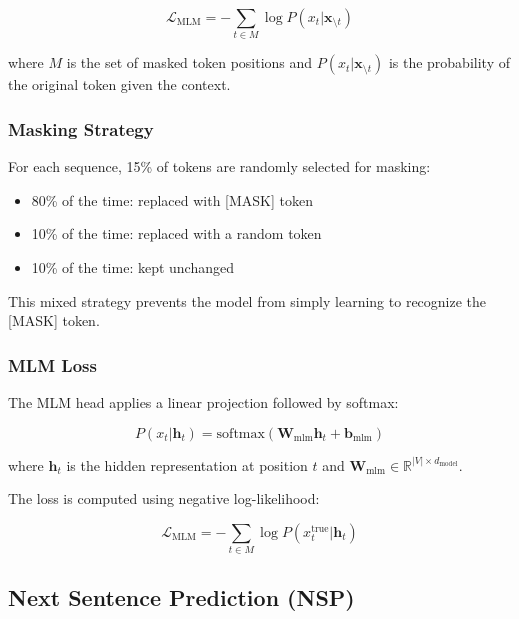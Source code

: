 \documentclass[11pt,a4paper]{article}
\begin{document}
\begin{equation}
\mathcal{L}_{\text{MLM}} = -\sum_{t \in M} \log P(x_t | \mathbf{x}_{\setminus t})
\end{equation}

where $M$ is the set of masked token positions and $P(x_t | \mathbf{x}_{\setminus t})$ is the probability of the original token given the context.

\subsubsection{Masking Strategy}

For each sequence, 15\% of tokens are randomly selected for masking:
\begin{itemize}
    \item 80\% of the time: replaced with [MASK] token
    \item 10\% of the time: replaced with a random token
    \item 10\% of the time: kept unchanged
\end{itemize}

This mixed strategy prevents the model from simply learning to recognize the [MASK] token.

\subsubsection{MLM Loss}

The MLM head applies a linear projection followed by softmax:

\begin{equation}
P(x_t | \mathbf{h}_t) = \text{softmax}(\mathbf{W}_{\text{mlm}}\mathbf{h}_t + \mathbf{b}_{\text{mlm}})
\end{equation}

where $\mathbf{h}_t$ is the hidden representation at position $t$ and $\mathbf{W}_{\text{mlm}} \in \mathbb{R}^{|V| \times d_{\text{model}}}$.

The loss is computed using negative log-likelihood:

\begin{equation}
\mathcal{L}_{\text{MLM}} = -\sum_{t \in M} \log P(x_t^{\text{true}} | \mathbf{h}_t)
\end{equation}

\subsection{Next Sentence Prediction (NSP)}
\end{document}
